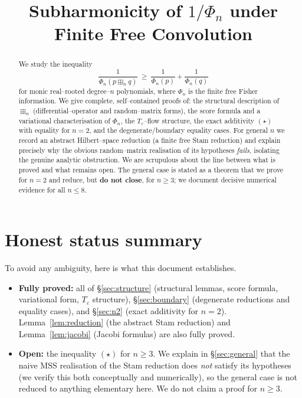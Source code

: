 \documentclass[12pt]{article}
\title{Subharmonicity of $1/\Phi_n$ under Finite Free Convolution}
\author{}
\date{}
\theoremstyle{definition}
\newcommand{\boxp}{\boxplus_n}
\begin{document}
\maketitle

\begin{abstract}
We study the inequality
\[
\frac{1}{\Phi_n(p\boxp q)}\ \ge\ \frac{1}{\Phi_n(p)}+\frac{1}{\Phi_n(q)} \tag{$\star$}
\]
for monic real--rooted degree--$n$ polynomials, where $\Phi_n$ is the finite free Fisher
information. We give complete, self--contained proofs of: the structural description of
$\boxp$ (differential--operator and random--matrix forms), the score formula and a
variational characterisation of $\Phi_n$, the $T_\varepsilon$--flow structure, the exact
additivity $(\star)$ with equality for $n=2$, and the degenerate/boundary equality cases.
For general $n$ we record an abstract Hilbert--space reduction (a finite free Stam reduction)
and explain precisely why the obvious random--matrix realisation of its hypotheses
\emph{fails}, isolating the genuine analytic obstruction. We are scrupulous about the line
between what is proved and what remains open. The general case is stated as a theorem that we
prove for $n=2$ and reduce, but \textbf{do not close}, for $n\ge3$; we document decisive
numerical evidence for all $n\le8$.
\end{abstract}

\section*{Honest status summary}

To avoid any ambiguity, here is what this document establishes.
\begin{itemize}
\item \textbf{Fully proved:} all of \S\ref{sec:structure} (structural lemmas, score formula,
variational form, $T_\varepsilon$ structure), \S\ref{sec:boundary} (degenerate reductions and
equality cases), and \S\ref{sec:n2} (exact additivity for $n=2$). Lemma~\ref{lem:reduction}
(the abstract Stam reduction) and Lemma~\ref{lem:jacobi} (Jacobi formulas) are also fully
proved.
\item \textbf{Open:} the inequality $(\star)$ for $n\ge3$. We explain in
\S\ref{sec:general} that the naive MSS realisation of the Stam reduction does \emph{not}
satisfy its hypotheses (we verify this both conceptually and numerically), so the general
case is not reduced to anything elementary here. We do not claim a proof for $n\ge3$.
\end{itemize}
\end{document}

